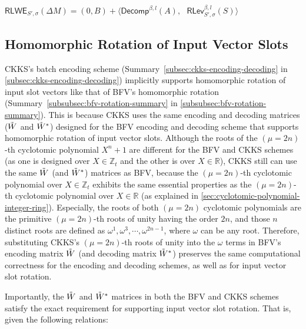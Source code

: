 \begin{tcolorbox}[title={\textbf{\tboxlabel{\ref*{subsec:ckks-key-switching}} CKKS's Key Switching}}]
$\textsf{RLWE}_{S',\sigma}(\Delta M) = (0, B) + \bm{\langle} \textsf{Decomp}^{\beta, l}(A), \text{ } \textsf{RLev}_{S', \sigma}^{\beta, l}(S) \bm{\rangle}$
\end{tcolorbox}




\subsection{Homomorphic Rotation of Input Vector Slots}
\label{subsec:ckks-rotation}

CKKS's batch encoding scheme (Summary~\ref*{subsec:ckks-encoding-decoding} in \autoref{subsec:ckks-encoding-decoding}) implicitly supports homomorphic rotation of input slot vectors like that of BFV's homomorphic rotation (Summary~\ref*{subsubsec:bfv-rotation-summary} in \autoref{subsubsec:bfv-rotation-summary}). This is because CKKS uses the same encoding and decoding matrices ($\tilde W$ and $\tilde{W}^*$) designed for the BFV encoding and decoding scheme that supports homomorphic rotation of input vector slots. Although the roots of the $(\mu=2n)$-th cyclotomic polynomial $X^n + 1$ are different for the BFV and CKKS schemes (as one is designed over $X \in \mathbb{Z}_t$ and the other is over $X \in \mathbb{R}$), CKKS still can use the same $\tilde W$ (and $\tilde{W}^*$) matrices as BFV, because the $(\mu=2n)$-th cyclotomic polynomial over $X \in \mathbb{Z}_t$ exhibits the same essential properties as the $(\mu=2n)$-th cyclotomic polynomial over $X \in \mathbb{R}$ (as explained in \autoref{sec:cyclotomic-polynomial-integer-ring}). Especially, the roots of both $(\mu=2n)$ cyclotomic polynomials are the primitive $(\mu=2n)$-th roots of unity having the order $2n$, and those $n$ distinct roots are defined as $\omega^1, \omega^3, \cdots, \omega^{2n-1}$, where $\omega$ can be any root. Therefore, substituting CKKS's $(\mu=2n)$-th roots of unity into the $\omega$ terms in BFV's encoding matrix $\tilde{W}$ (and decoding matrix $\tilde{W}^*$) preserves the same computational correctness for the encoding and decoding schemes, as well as for input vector slot rotation. 

Importantly, the $\tilde{W}$ and $\tilde{W}^*$ matrices in both the BFV and CKKS schemes satisfy the exact requirement for supporting input vector slot rotation. That is, given the following relations:

